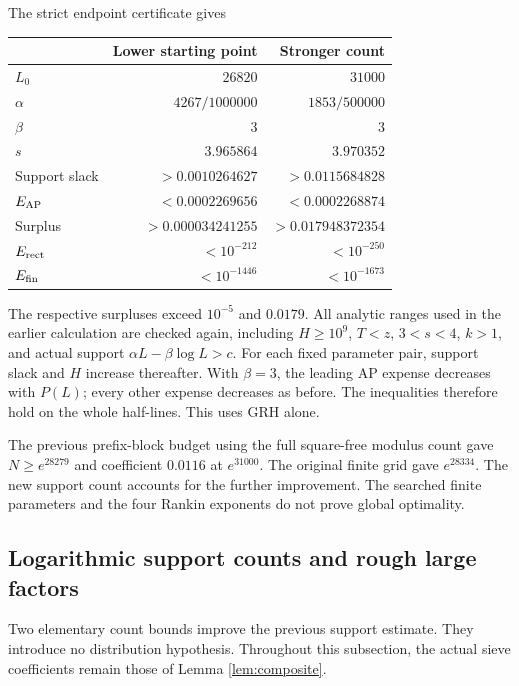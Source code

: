 \documentclass[11pt]{article}
\begin{document}
The strict endpoint certificate gives
\begin{center}
\begin{tabular}{lrr}\toprule
 & Lower starting point & Stronger count\\\midrule
$L_0$ & $26820$ & $31000$\\
$\alpha$ & $4267/1000000$ & $1853/500000$\\
$\beta$ & $3$ & $3$\\
$s$ & $3.965864$ & $3.970352$\\
Support slack & $>0.0010264627$ & $>0.0115684828$\\
$E_{\rm AP}$ & $<0.0002269656$ & $<0.0002268874$\\
Surplus & $>0.000034241255$ & $>0.017948372354$\\
$E_{\rm rect}$ & $<10^{-212}$ & $<10^{-250}$\\
$E_{\rm fin}$ & $<10^{-1446}$ & $<10^{-1673}$\\\bottomrule
\end{tabular}
\end{center}
The respective surpluses exceed $10^{-5}$ and $0.0179$.
All analytic ranges used in the earlier calculation are checked again,
including $H\ge10^9$, $T<z$, $3<s<4$, $k>1$, and actual support
$\alpha L-\beta\log L>c$.
For each fixed parameter pair, support slack and $H$ increase thereafter.
With $\beta=3$, the leading AP expense decreases with $P(L)$;
every other expense decreases as before. The inequalities therefore
hold on the whole half-lines. This uses GRH alone.

The previous prefix-block budget using the full square-free modulus count
gave $N\ge e^{28279}$ and coefficient $0.0116$ at $e^{31000}$.
The original finite grid gave $e^{28334}$.
The new support count accounts for the further improvement.
The searched finite parameters and the four Rankin exponents do not
prove global optimality.
\subsection{Logarithmic support counts and rough large factors}\label{sec:roughinterval}
Two elementary count bounds improve the previous support estimate.
They introduce no distribution hypothesis. Throughout this subsection,
the actual sieve coefficients remain those of Lemma \ref{lem:composite}.
\end{document}
